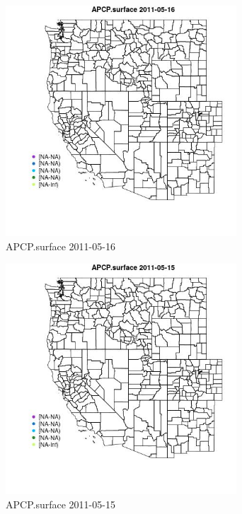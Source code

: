 \begin{figure} 
\centering  
\includegraphics[width=0.77\textwidth]{Code_Outputs/ML_input_report_ML_input_PM25_Step5_part_d_de_duplicated_aves_ML_input_MapObsAPCPsurface2011-05-16.jpg} 
\caption{\label{fig:ML_input_report_ML_input_PM25_Step5_part_d_de_duplicated_aves_ML_inputMapObsAPCPsurface2011-05-16}APCP.surface 2011-05-16} 
\end{figure} 
 

\begin{figure} 
\centering  
\includegraphics[width=0.77\textwidth]{Code_Outputs/ML_input_report_ML_input_PM25_Step5_part_d_de_duplicated_aves_ML_input_MapObsAPCPsurface2011-05-15.jpg} 
\caption{\label{fig:ML_input_report_ML_input_PM25_Step5_part_d_de_duplicated_aves_ML_inputMapObsAPCPsurface2011-05-15}APCP.surface 2011-05-15} 
\end{figure} 
 

